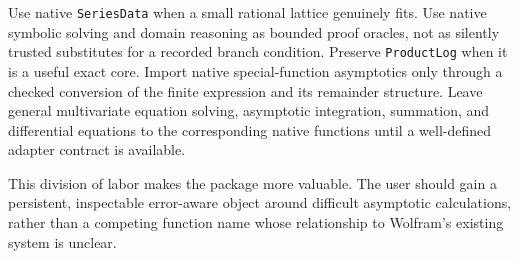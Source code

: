 Use native \texttt{SeriesData} when a small rational lattice genuinely fits. Use native symbolic solving and domain reasoning as bounded proof oracles, not as silently trusted substitutes for a recorded branch condition. Preserve \texttt{ProductLog} when it is a useful exact core. Import native special-function asymptotics only through a checked conversion of the finite expression and its remainder structure. Leave general multivariate equation solving, asymptotic integration, summation, and differential equations to the corresponding native functions until a well-defined adapter contract is available.\cite{wl-seriesdata,wl-asymptoticsolve,wl-integrate,wl-sum,wl-dsolve,wl-rsolve,native}

This division of labor makes the package more valuable. The user should gain a persistent, inspectable error-aware object around difficult asymptotic calculations, rather than a competing function name whose relationship to Wolfram's existing system is unclear.
